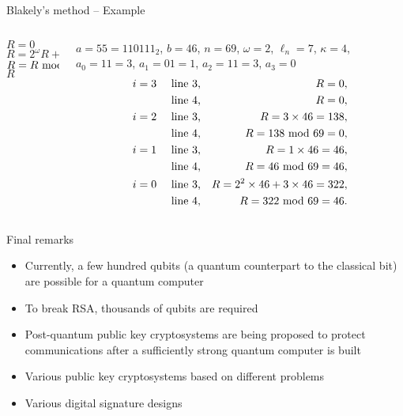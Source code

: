 \begin{frame}{Blakely's method -- Example}
\begin{columns}[T] %
\begin{column}{.4\textwidth}
{
\setlength{\interspacetitleruled}{0pt}%
\setlength{\algotitleheightrule}{0pt}%
\begin{algorithm}[H]
$R=0$\\
 	{
 	$R=2^{\omega}R+a_ib$\\
        $R=R\textrm{~mod~} n$
  	}
  	\Return $R$
\end{algorithm}
}
\end{column}%
\hfill%
\begin{column}{.6\textwidth}
\begin{example}
   $a=55=110111_2$, $b=46$, $n=69$, $\omega=2$, $\ell_n=7$, $\kappa=4$, $
    a_0=11=3$, $a_1=01=1$, $a_2=11=3$, $a_3=0$
    \begin{eqnarray*}
        i=3\quad & \text{ line~3,} & R=0,\\
         & \text{ line~4,} & R=0,\\
        i=2\quad & \text{ line~3,} & R=3\times46=138,\\
         & \text{ line~4,} & R=138\textrm{~mod~}69=0,\\
        i=1 \quad& \text{ line~3,} & R=1\times46=46,\\
         & \text{ line~4,} & R=46\textrm{~mod~}69=46,\\
         i=0 \quad& \text{ line~3,} & R=2^2\times46+3\times46=322,\\
         & \text{ line~4,} & R=322\textrm{~mod~}69=46.
    \end{eqnarray*}
\end{example}
\end{column}%
\end{columns}
\end{frame}

\begin{frame}{Final remarks}
    \begin{itemize}
        \item Currently, a few hundred qubits (a quantum counterpart to the classical bit) are possible for a quantum computer
        \item To break RSA, thousands of qubits are required
        \item Post-quantum public key cryptosystems are being proposed to protect communications after a sufficiently strong quantum computer is built
        \item Various public key cryptosystems based on different problems
        \item Various digital signature designs
    \end{itemize}
\end{frame}

